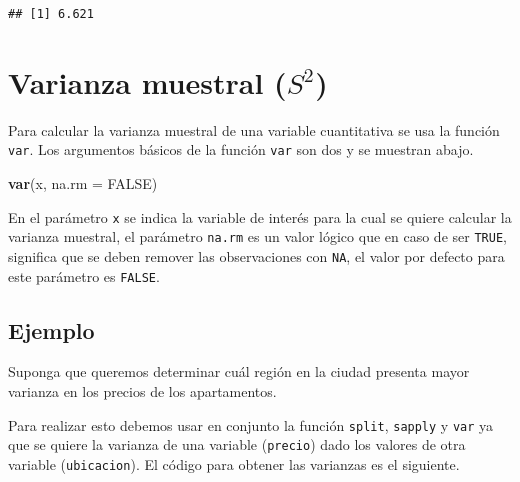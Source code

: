 \documentclass[10pt,]{krantz}
\makeatletter
\newenvironment{Shaded}{\begin{snugshade}}{\end{snugshade}}
\newcommand{\KeywordTok}[1]{\textcolor[rgb]{0.13,0.29,0.53}{\textbf{{#1}}}}
\newcommand{\DataTypeTok}[1]{\textcolor[rgb]{0.13,0.29,0.53}{{#1}}}
\newcommand{\StringTok}[1]{\textcolor[rgb]{0.31,0.60,0.02}{{#1}}}
\newcommand{\OtherTok}[1]{\textcolor[rgb]{0.56,0.35,0.01}{{#1}}}
\newcommand{\NormalTok}[1]{{#1}}
\newenvironment{kframe}{%
\medskip{}
\setlength{\fboxsep}{.8em}
 \def\at@end@of@kframe{}%
 \ifinner\ifhmode%
  \def\at@end@of@kframe{\end{minipage}}%
  \begin{minipage}{\columnwidth}%
 \fi\fi%
 \def\FrameCommand##1{\hskip\@totalleftmargin \hskip-\fboxsep
 \colorbox{shadecolor}{##1}\hskip-\fboxsep
     \hskip-\linewidth \hskip-\@totalleftmargin \hskip\columnwidth}%
 \MakeFramed {\advance\hsize-\width
   \@totalleftmargin\z@ \linewidth\hsize
   \@setminipage}}%
 {\par\unskip\endMakeFramed%
 \at@end@of@kframe}
\renewenvironment{Shaded}{\begin{kframe}}{\end{kframe}}
\makeatother
\begin{document}
\begin{verbatim}
## [1] 6.621
\end{verbatim}

\section{\texorpdfstring{Varianza muestral (\(S^2\)) 
}{Varianza muestral (S\^{}2)  }}\label{varianza-muestral-s2}

Para calcular la varianza muestral de una variable cuantitativa se usa
la función \texttt{var}. Los argumentos básicos de la función
\texttt{var} son dos y se muestran abajo.

\begin{Shaded}
\begin{Highlighting}[]
\KeywordTok{var}\NormalTok{(x, }\DataTypeTok{na.rm =} \OtherTok{FALSE}\NormalTok{)}
\end{Highlighting}
\end{Shaded}

En el parámetro \texttt{x} se indica la variable de interés para la cual
se quiere calcular la varianza muestral, el parámetro \texttt{na.rm} es
un valor lógico que en caso de ser \texttt{TRUE}, significa que se deben
remover las observaciones con \texttt{NA}, el valor por defecto para
este parámetro es \texttt{FALSE}.

\subsection*{Ejemplo}\label{ejemplo-39}


Suponga que queremos determinar cuál región en la ciudad presenta mayor
varianza en los precios de los apartamentos.

Para realizar esto debemos usar en conjunto la función \texttt{split},
\texttt{sapply} y \texttt{var} ya que se quiere la varianza de una
variable (\texttt{precio}) dado los valores de otra variable
(\texttt{ubicacion}). El código para obtener las varianzas es el
siguiente.

\begin{Shaded}
\end{Shaded}
\end{document}
